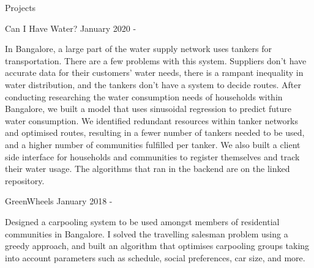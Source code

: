\documentclass{resume} %
\begin{document}
\begin{rSection}{Projects}
\begin{rSubsection}{ Can I Have Water? }{ January 2020 -  }{}
\item In Bangalore, a large part of the water supply network uses tankers for transportation. There are a few problems with this system. Suppliers don’t have accurate data for their customers’ water needs, there is a rampant inequality in water distribution, and the tankers don't have a system to decide routes. After conducting researching the water consumption needs of households within Bangalore, we built a model that uses sinusoidal regression to predict future water consumption. We identified redundant resources within tanker networks and optimised routes, resulting in a fewer number of tankers needed to be used, and a higher number of communities fulfilled per tanker. We also built a client side interface for households and communities to register themselves and track their water usage. The algorithms that ran in the backend are on the linked repository.
\end{rSubsection}



\begin{rSubsection}{ GreenWheels }{ January 2018 -  }{}
\item Designed a carpooling system to be used amongst members of residential communities in Bangalore. I solved the travelling salesman problem using a greedy approach, and built an algorithm that optimises carpooling groups taking into account parameters such as schedule, social preferences, car size, and more.
\end{rSubsection}




























\end{rSection}
\end{document}
